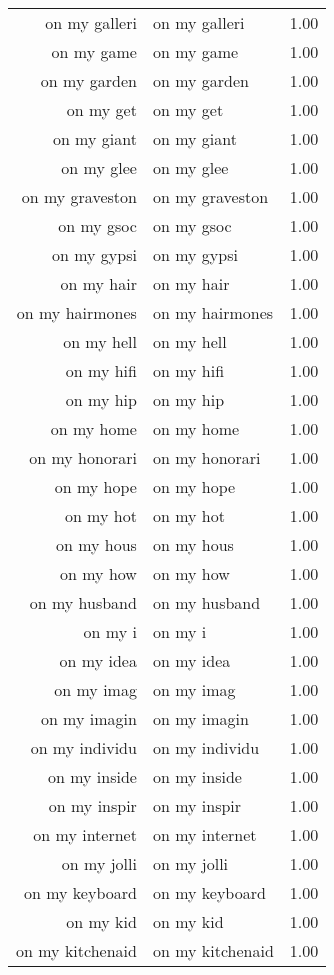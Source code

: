 \begin{table}[ht]
\begin{tabular}{rlr}
  on my galleri & on my galleri & 1.00 \\ 
  on my game & on my game & 1.00 \\ 
  on my garden & on my garden & 1.00 \\ 
  on my get & on my get & 1.00 \\ 
  on my giant & on my giant & 1.00 \\ 
  on my glee & on my glee & 1.00 \\ 
  on my graveston & on my graveston & 1.00 \\ 
  on my gsoc & on my gsoc & 1.00 \\ 
  on my gypsi & on my gypsi & 1.00 \\ 
  on my hair & on my hair & 1.00 \\ 
  on my hairmones & on my hairmones & 1.00 \\ 
  on my hell & on my hell & 1.00 \\ 
  on my hifi & on my hifi & 1.00 \\ 
  on my hip & on my hip & 1.00 \\ 
  on my home & on my home & 1.00 \\ 
  on my honorari & on my honorari & 1.00 \\ 
  on my hope & on my hope & 1.00 \\ 
  on my hot & on my hot & 1.00 \\ 
  on my hous & on my hous & 1.00 \\ 
  on my how & on my how & 1.00 \\ 
  on my husband & on my husband & 1.00 \\ 
  on my i & on my i & 1.00 \\ 
  on my idea & on my idea & 1.00 \\ 
  on my imag & on my imag & 1.00 \\ 
  on my imagin & on my imagin & 1.00 \\ 
  on my individu & on my individu & 1.00 \\ 
  on my inside & on my inside & 1.00 \\ 
  on my inspir & on my inspir & 1.00 \\ 
  on my internet & on my internet & 1.00 \\ 
  on my jolli & on my jolli & 1.00 \\ 
  on my keyboard & on my keyboard & 1.00 \\ 
  on my kid & on my kid & 1.00 \\ 
  on my kitchenaid & on my kitchenaid & 1.00 \\ 

\end{tabular}
\end{table}
